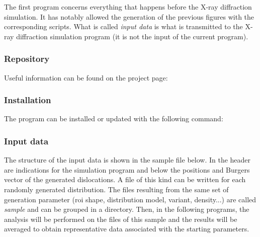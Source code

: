 The first program concerns everything that happens before the X-ray diffraction simulation.
It has notably allowed the generation of the previous figures with the corresponding scripts.
What is called \textit{input data} is what is transmitted to the X-ray diffraction simulation program (it is not the input of the current program).

\subsubsection{Repository}

Useful information can be found on the project page: 

\subsubsection{Installation}

The program can be installed or updated with the following command:


\subsubsection{Input data}

The structure of the input data is shown in the sample file below.
In the header are indications for the simulation program and below the positions and Burgers vector of the generated dislocations.
A file of this kind can be written for each randomly generated distribution.
The files resulting from the same set of generation parameter (\gls{roi} shape, distribution model, variant, density...) are called \textit{sample} and can be grouped in a directory.
Then, in the following programs, the analysis will be performed on the files of this sample and the results will be averaged to obtain representative data associated with the starting parameters.


